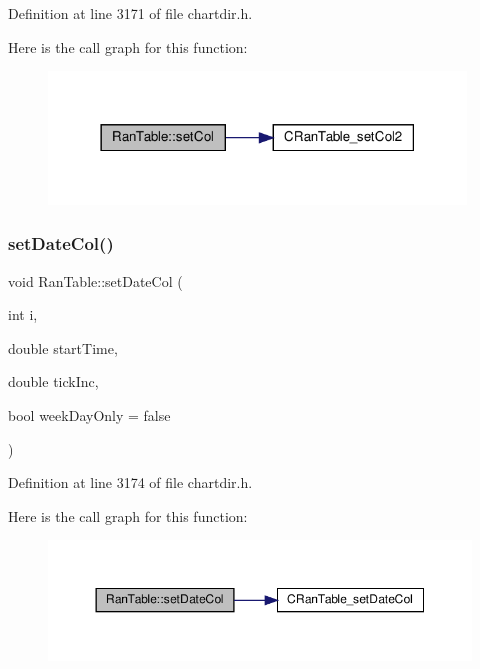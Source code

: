 Definition at line 3171 of file chartdir.\+h.

Here is the call graph for this function\+:
\nopagebreak
\begin{figure}[H]
\begin{center}
\leavevmode
\includegraphics[width=314pt]{class_ran_table_a7d3124584c2fec6e029e1fc23771570f_cgraph}
\end{center}
\end{figure}
\mbox{\label{class_ran_table_a43a91048df7d3dcdeebe4342a6c6b514}} 
\subsubsection{\texorpdfstring{set\+Date\+Col()}{setDateCol()}}
{\footnotesize\ttfamily void Ran\+Table\+::set\+Date\+Col (\begin{DoxyParamCaption}\item[{int}]{i,  }\item[{double}]{start\+Time,  }\item[{double}]{tick\+Inc,  }\item[{bool}]{week\+Day\+Only = {\ttfamily false} }\end{DoxyParamCaption})\hspace{0.3cm}{\ttfamily [inline]}}



Definition at line 3174 of file chartdir.\+h.

Here is the call graph for this function\+:
\nopagebreak
\begin{figure}[H]
\begin{center}
\leavevmode
\includegraphics[width=350pt]{class_ran_table_a43a91048df7d3dcdeebe4342a6c6b514_cgraph}
\end{center}
\end{figure}
\mbox{\label{class_ran_table_a7df8569529d0bda58899803aa8972f38}} 
